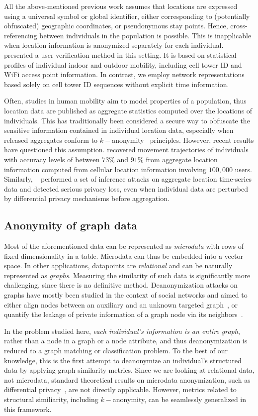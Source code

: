 All the above-mentioned previous work assumes that locations are expressed using a universal symbol or global identifier, either corresponding to (potentially obfuscated) geographic coordinates, or pseudonymous stay points.
Hence, cross-referencing between individuals in the population is possible.
This is inapplicable when location information is anonymized separately for each individual.
\textcite{LinMobile} presented a user verification method in this setting.
It is based on statistical profiles of individual indoor and outdoor mobility, including cell tower ID and WiFi access point information.
In contrast, we employ network representations based solely on cell tower ID sequences without explicit time information.

Often, studies in human mobility aim to model properties of a population, thus location data are published as aggregate statistics computed over the locations of individuals.
This has traditionally been considered a secure way to obfuscate the sensitive information contained in individual location data, especially when released aggregates conform to $ k-$anonymity~\citep{sweeney2002k} principles.
However, recent results have questioned this assumption.
\textcite{xu2017trajectory} recovered movement trajectories of individuals with accuracy levels of between $73\%$ and $91\%$ from aggregate location information computed from cellular location information involving $100,000$ users. Similarly, ~\textcite{pyrgelis2017does} performed a set of inference attacks on aggregate location time-series data and detected serious privacy loss, even when individual data are perturbed by differential privacy mechanisms before aggregation.

\subsection{Anonymity of graph data }
Most of the aforementioned data can be represented as \emph{microdata} with rows of fixed dimensionality in a table.
Microdata can thus be embedded into a vector space.
In other applications, datapoints are \emph{relational} and can be naturally represented as \emph{graphs}.
Measuring the similarity of such data is significantly more challenging, since there is no definitive method.
Deanonymization attacks on graphs have mostly been studied in the context of social networks and aimed to either align nodes between an auxiliary and an unknown targeted graph~\citep{narayanan2009anonymizing, sharad2014}, or quantify the leakage of private information of a graph node via its neighbors~\citep{zheleva09}.

In the problem studied here, \emph{each individual's information is an entire graph}, rather than a node in a graph or a node attribute, and thus deanonymization is reduced to a graph matching or classification problem.
To the best of our knowledge, this is the first attempt to deanonymize an individual's structured data by applying graph similarity metrics.
Since we are looking at relational data, not microdata, standard theoretical results on microdata anonymization, such as differential privacy~\citep{dwork2006calibrating}, are not directly applicable.
However, metrics related to structural similiarity, including $k-$anonymity, can be seamlessly generalized in this framework.
